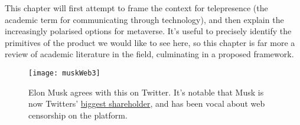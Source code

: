 This chapter will first attempt to frame the context for telepresence (the academic term for communicating through technology), and then explain the increasingly polarised options for metaverse. It's useful to precisely identify the primitives of the product we would like to see here, so this chapter is far more a review of academic literature in the field, culminating in a proposed framework.\par
\begin{figure}
  \centering
    \texttt{[image: muskWeb3]}
  \caption{Elon Musk agrees with this on Twitter. It's notable that Musk is now Twitters' \href{https://twitter.com/paraga/status/1511320953598357505}{biggest shareholder}, and has been vocal about web censorship on the platform.}
  \label{fig:muskWeb3}
\end{figure}
    
